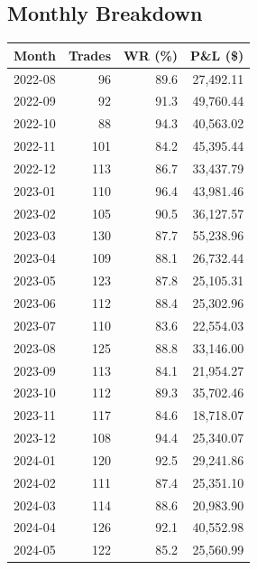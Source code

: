 \documentclass[11pt,a4paper,twoside]{article}
\begin{document}
\subsection{Monthly Breakdown}
\noindent\begin{center}
\begin{tabular}{>{\color{txtmain}}l rrr}
\toprule
\rowcolor{cardbg}
\textbf{Month} & \textbf{Trades} & \textbf{WR (\%)} & \textbf{P\&L (\$)} \\
\midrule
2022-08 & 96 & 89.6 & \textcolor{wingreen}{27,492.11} \\
2022-09 & 92 & 91.3 & \textcolor{wingreen}{49,760.44} \\
2022-10 & 88 & 94.3 & \textcolor{wingreen}{40,563.02} \\
2022-11 & 101 & 84.2 & \textcolor{wingreen}{45,395.44} \\
2022-12 & 113 & 86.7 & \textcolor{wingreen}{33,437.79} \\
2023-01 & 110 & 96.4 & \textcolor{wingreen}{43,981.46} \\
2023-02 & 105 & 90.5 & \textcolor{wingreen}{36,127.57} \\
2023-03 & 130 & 87.7 & \textcolor{wingreen}{55,238.96} \\
2023-04 & 109 & 88.1 & \textcolor{wingreen}{26,732.44} \\
2023-05 & 123 & 87.8 & \textcolor{wingreen}{25,105.31} \\
2023-06 & 112 & 88.4 & \textcolor{wingreen}{25,302.96} \\
2023-07 & 110 & 83.6 & \textcolor{wingreen}{22,554.03} \\
2023-08 & 125 & 88.8 & \textcolor{wingreen}{33,146.00} \\
2023-09 & 113 & 84.1 & \textcolor{wingreen}{21,954.27} \\
2023-10 & 112 & 89.3 & \textcolor{wingreen}{35,702.46} \\
2023-11 & 117 & 84.6 & \textcolor{wingreen}{18,718.07} \\
2023-12 & 108 & 94.4 & \textcolor{wingreen}{25,340.07} \\
2024-01 & 120 & 92.5 & \textcolor{wingreen}{29,241.86} \\
2024-02 & 111 & 87.4 & \textcolor{wingreen}{25,351.10} \\
2024-03 & 114 & 88.6 & \textcolor{wingreen}{20,983.90} \\
2024-04 & 126 & 92.1 & \textcolor{wingreen}{40,552.98} \\
2024-05 & 122 & 85.2 & \textcolor{wingreen}{25,560.99} \\

\end{tabular}
\end{center}
\end{document}
